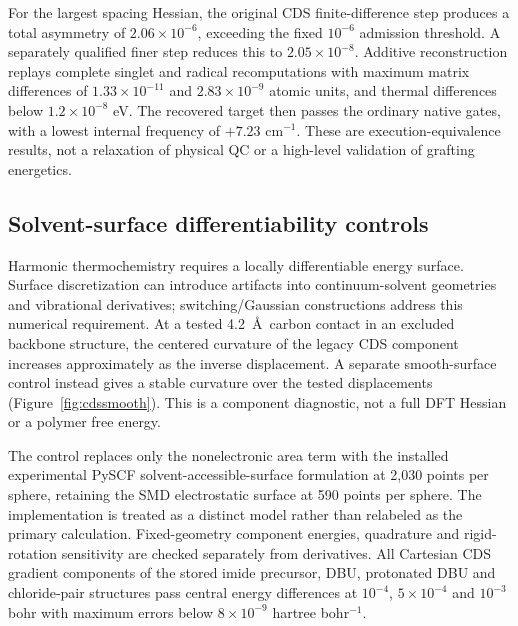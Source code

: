 \documentclass[11pt]{article}
\begin{document}
For the largest spacing Hessian, the original CDS finite-difference step produces a total asymmetry of $2.06\times10^{-6}$, exceeding the fixed $10^{-6}$ admission threshold. A separately qualified finer step reduces this to $2.05\times10^{-8}$. Additive reconstruction replays complete singlet and radical recomputations with maximum matrix differences of $1.33\times10^{-11}$ and $2.83\times10^{-9}$ atomic units, and thermal differences below $1.2\times10^{-8}$ eV. The recovered target then passes the ordinary native gates, with a lowest internal frequency of $+7.23$ cm$^{-1}$. These are execution-equivalence results, not a relaxation of physical QC or a high-level validation of grafting energetics.

\subsection{Solvent-surface differentiability controls}
Harmonic thermochemistry requires a locally differentiable energy surface. Surface discretization can introduce artifacts into continuum-solvent geometries and vibrational derivatives; switching/Gaussian constructions address this numerical requirement.\cite{langeherbert2010} At a tested 4.2~\AA\ carbon contact in an excluded backbone structure, the centered curvature of the legacy CDS component increases approximately as the inverse displacement. A separate smooth-surface control instead gives a stable curvature over the tested displacements (Figure~\ref{fig:cdssmooth}). This is a component diagnostic, not a full DFT Hessian or a polymer free energy.

The control replaces only the nonelectronic area term with the installed experimental PySCF solvent-accessible-surface formulation at 2,030 points per sphere, retaining the SMD electrostatic surface at 590 points per sphere. The implementation is treated as a distinct model rather than relabeled as the primary calculation. Fixed-geometry component energies, quadrature and rigid-rotation sensitivity are checked separately from derivatives. All Cartesian CDS gradient components of the stored imide precursor, DBU, protonated DBU and chloride-pair structures pass central energy differences at $10^{-4}$, $5\times10^{-4}$ and $10^{-3}$ bohr with maximum errors below $8\times10^{-9}$ hartree bohr$^{-1}$.
\end{document}

